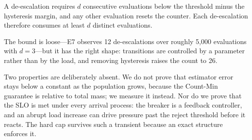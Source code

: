 \begin{IEEEproof}
A de-escalation requires $d$ consecutive evaluations below the threshold minus the
hysteresis margin, and any other evaluation resets the counter. Each de-escalation therefore consumes at least $d$ distinct
evaluations.
\end{IEEEproof}

The bound is loose---E7 observes 12 de-escalations over roughly 5{,}000 evaluations
with $d=3$---but it has the right shape: transitions are controlled by a parameter
rather than by the load, and removing hysteresis raises the count to 26.

Two properties are deliberately absent. We do not prove that estimator error stays
below a constant as the population grows, because the Count-Min guarantee is
relative to total mass; we measure it instead. Nor do we prove that the SLO is met under
every arrival process: the breaker is a feedback controller, and an abrupt load
increase can drive pressure past the reject threshold before it reacts. The hard cap
survives such a transient because an exact structure enforces it.